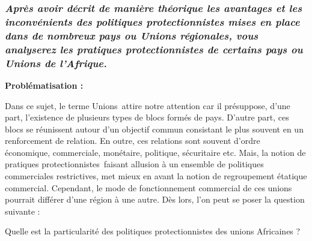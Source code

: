 
\newpage %
	\subsubsection*{\textit{Après avoir décrit de manière théorique les avantages et les inconvénients des politiques protectionnistes mises en place dans de nombreux pays ou Unions régionales, vous analyserez les pratiques protectionnistes de certains pays ou Unions de l'Afrique.}}

\textbf{Problématisation :} 

Dans ce sujet, le terme \guillemetleft Unions\guillemetright\ attire notre attention car il présuppose, d'une part, l'existence de plusieurs types de blocs formés de pays. D'autre part, ces blocs se réunissent autour d'un objectif commun consistant le plus souvent en un renforcement de relation. En outre, ces relations sont souvent d'ordre économique, commerciale, monétaire, politique, sécuritaire etc. Mais, la notion de \guillemetleft pratiques protectionnistes\guillemetright\ faisant allusion à un ensemble de politiques commerciales restrictives, met mieux en avant la notion de regroupement étatique commercial. Cependant, le mode de fonctionnement commercial de ces unions pourrait différer d'une région à une autre. Dès lors, l'on peut se poser la question suivante :

Quelle est la particularité des politiques protectionnistes des unions Africaines ?

 